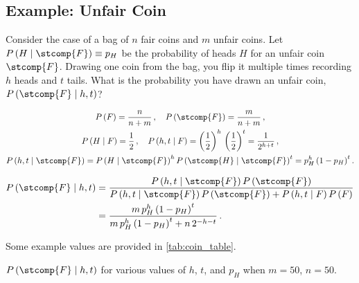 \subsection{Example: Unfair Coin}
\label{stats:Bayes:unfair_coin}

Consider the case of a bag of $n$ fair coins and $m$ unfair coins.
Let $P\left(H \mid \stcomp{F}\right) \equiv p_{H}$ be the \apriori probability of heads $H$ for an unfair coin $\stcomp{F}$.
Drawing one coin from the bag, you flip it multiple times recording $h$ heads and $t$ tails.
What is the probability you have drawn an unfair coin, $P\left(\stcomp{F} \mid h,t\right)$?

\begin{equation}\label{eq:stats:Bayes:unfair_coin_setup}
\begin{gathered}
P\left(F\right) = \frac{n}{n+m}\,,\quad P\left(\stcomp{F}\right) = \frac{m}{n+m}\,, \\
P\left(H \mid F\right) = \frac{1}{2}\,,\quad P\left(h,t \mid F\right) = \left(\frac{1}{2}\right)^{h}\,\left(\frac{1}{2}\right)^{t} = \frac{1}{2^{h+t}}\,, \\
P\left(h,t \mid \stcomp{F}\right) = P\left(H \mid \stcomp{F}\right)^{h} P\left(\stcomp{H} \mid \stcomp{F}\right)^{t} = p_{H}^{h} \left(1-p_{H}\right)^{t}.
\end{gathered}
\end{equation}

\begin{equation}\label{eq:stats:Bayes:unfair_coin_solution}
\begin{split}
P\left(\stcomp{F} \mid h,t\right) &= \frac{
P\left(h,t \mid \stcomp{F}\right) P\left(\stcomp{F}\right)}{
P\left(h,t \mid \stcomp{F}\right) P\left(\stcomp{F}\right) + P\left(h,t \mid F\right) P\left(F\right)} \\
&= \frac{
m\,p_{H}^{h} \left(1-p_{H}\right)^{t}}{
m\,p_{H}^{h} \left(1-p_{H}\right)^{t} + n\,2^{-h-t}}\,.
\end{split}
\end{equation}

Some example values are provided in \cref{tab:coin_table}.

\begin{table}[H]
\centering
\begingroup
\renewcommand*{\arraystretch}{1}

\endgroup
\caption{
$P\left(\stcomp{F} \mid h,t\right)$ for various values of $h$, $t$, and $p_{H}$ when $m = 50$, $n = 50$.
}
\label{tab:coin_table}
\end{table}

